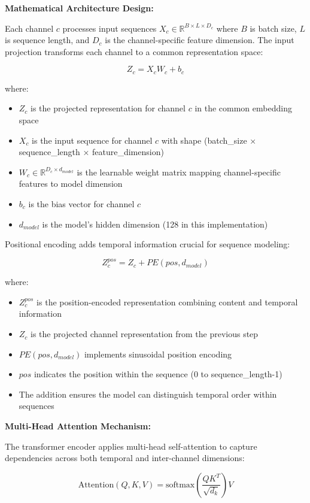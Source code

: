 \documentclass[a4paper,12pt,twoside]{article}
\begin{document}
\textbf{Mathematical Architecture Design:}

Each channel $c$ processes input sequences $X_c \in \mathbb{R}^{B \times L \times D_c}$ where $B$ is batch size, $L$ is sequence length, and $D_c$ is the channel-specific feature dimension. The input projection transforms each channel to a common representation space:

$$Z_c = X_c W_c + b_c$$

where:
\begin{itemize}
    \item $Z_c$ is the projected representation for channel $c$ in the common embedding space
    \item $X_c$ is the input sequence for channel $c$ with shape (batch\_size × sequence\_length × feature\_dimension)
    \item $W_c \in \mathbb{R}^{D_c \times d_{model}}$ is the learnable weight matrix mapping channel-specific features to model dimension
    \item $b_c$ is the bias vector for channel $c$
    \item $d_{model}$ is the model's hidden dimension (128 in this implementation)
\end{itemize}

Positional encoding adds temporal information crucial for sequence modeling:

$$Z_c^{pos} = Z_c + PE(pos, d_{model})$$

where:
\begin{itemize}
    \item $Z_c^{pos}$ is the position-encoded representation combining content and temporal information
    \item $Z_c$ is the projected channel representation from the previous step
    \item $PE(pos, d_{model})$ implements sinusoidal position encoding
    \item $pos$ indicates the position within the sequence (0 to sequence\_length-1)
    \item The addition ensures the model can distinguish temporal order within sequences
\end{itemize}

\textbf{Multi-Head Attention Mechanism:}

The transformer encoder applies multi-head self-attention to capture dependencies across both temporal and inter-channel dimensions:

$$\text{Attention}(Q, K, V) = \text{softmax}\left(\frac{QK^T}{\sqrt{d_k}}\right)V$$
\end{document}
